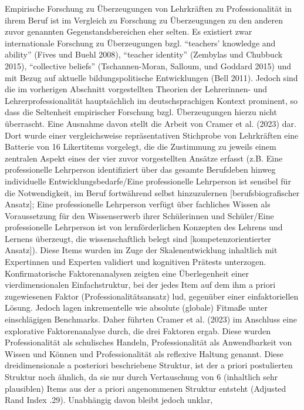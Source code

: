 \documentclass[
  letterpaper,
  DIV=11]{scrartcl}
\begin{document}
Empirische Forschung zu Überzeugungen von Lehrkräften zu
Professionalität in ihrem Beruf ist im Vergleich zu Forschung zu
Überzeugungen zu den anderen zuvor genannten Gegenstandsbereichen eher
selten. Es existiert zwar internationale Forschung zu Überzeugungen
bzgl. ``teachers' knowledge and ability'' (Fives und Buehl 2008),
``teacher identity'' (Zembylas und Chubbuck 2015), ``collective
beliefs'' (Tschannen-Moran, Salloum, und Goddard 2015) und mit Bezug auf
aktuelle bildungspolitische Entwicklungen (Bell 2011). Jedoch sind die
im vorherigen Abschnitt vorgestellten Theorien der Lehrerinnen- und
Lehrerprofessionalität hauptsächlich im deutschsprachigen Kontext
prominent, so dass die Seltenheit empirischer Forschung bzgl.
Überzeugungen hierzu nicht überrascht. Eine Ausnahme davon stellt die
Arbeit von Cramer et al. (2023) dar. Dort wurde einer vergleichsweise
repräsentativen Stichprobe von Lehrkräften eine Batterie von 16
Likertitems vorgelegt, die die Zustimmung zu jeweils einem zentralen
Aspekt eines der vier zuvor vorgestellten Ansätze erfasst (z.B. Eine
professionelle Lehrperson identifiziert über das gesamte Berufsleben
hinweg individuelle Entwicklungsbedarfe/Eine professionelle Lehrperson
ist sensibel für die Notwendigkeit, im Beruf fortwährend selbst
hinzuzulernen {[}berufsbiografischer Ansatz{]}; Eine professionelle
Lehrperson verfügt über fachliches Wissen als Voraussetzung für den
Wissenserwerb ihrer Schülerinnen und Schüler/Eine professionelle
Lehrperson ist von lernförderlichen Konzepten des Lehrens und Lernens
überzeugt, die wissenschaftlich belegt sind {[}kompetenzorientierter
Ansatz{]}). Diese Items wurden im Zuge der Skalenentwicklung inhaltlich
mit Expertinnen und Experten validiert und kognitiven Prätests
unterzogen. Konfirmatorische Faktorenanalysen zeigten eine Überlegenheit
einer vierdimensionalen Einfachstruktur, bei der jedes Item auf dem ihm
a priori zugewiesenen Faktor (Professionalitätsansatz) lud, gegenüber
einer einfaktoriellen Lösung. Jedoch lagen inkrementelle wie absolute
(globale) Fitmaße unter einschlägigen Benchmarks. Daher führten Cramer
et al. (2023) im Anschluss eine explorative Faktorenanalyse durch, die
drei Faktoren ergab. Diese wurden Professionalität als schulisches
Handeln, Professionalität als Anwendbarkeit von Wissen und Können und
Professionalität als reflexive Haltung genannt. Diese dreidimensionale a
posteriori beschriebene Struktur, ist der a priori postulierten Struktur
noch ähnlich, da sie nur durch Vertauschung von 6 (inhaltlich sehr
plausiblen) Items aus der a priori angenommenen Struktur entsteht
(Adjusted Rand Index .29). Unabhängig davon bleibt jedoch unklar,
\end{document}
